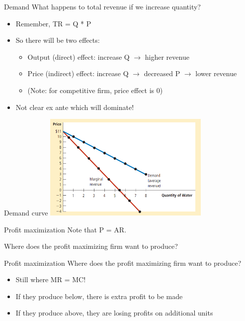 \documentclass[aspectratio=169]{beamer}
\begin{document}
\begin{frame}{Demand}
    What happens to total revenue if we increase quantity?
    
    \begin{itemize}
        \item Remember, TR = Q * P
        \item So there will be two effects:
        \begin{itemize}
            \item Output (direct) effect: increase Q $\to$ higher revenue
            \item Price (indirect) effect: increase Q $\to$ decreased P $\to$ lower revenue
            \item (Note: for competitive firm, price effect is 0)
        \end{itemize}
        \item Not clear ex ante which will dominate!
    \end{itemize}
\end{frame}

\begin{frame}{Demand curve}
    \centering
    \includegraphics[width = 0.6\textwidth,keepaspectratio]{../figs/demandMR.png}
\end{frame}

\begin{frame}{Profit maximization}
    Note that P  = AR.
        
    \vspace{5mm}

    Where does the profit maximizing firm want to produce? 
\end{frame}

\begin{frame}{Profit maximization}
    Where does the profit maximizing firm want to produce? 

    \begin{itemize}
        \item Still where MR = MC!
        \item If they produce below, there is extra profit to be made
        \item If they produce above, they are losing profits on additional units
    \end{itemize}
\end{frame}
\end{document}

